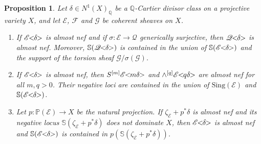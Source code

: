 \documentclass[english,reqno]{amsart}
\newcommand\bbQ{{\mathbb Q}}
\newcommand\bbS{{\mathbb S}}
\newcommand\sE{{\mathscr E}}
\newcommand\sF{{\mathscr F}}
\newcommand\sG{{\mathscr G}}
\newcommand\sQ{{\mathscr Q}}
\theoremstyle{plain}
\newtheorem{prop}[thm]{Proposition}
\theoremstyle{definition}
\numberwithin{equation}{section} %
\begin{document}
\begin{prop}\label{Almost-nef-properties}
    Let $\delta\in N^1(X)_{\bbQ}$ be a $\bbQ$-Cartier divisor class on a projective variety $X$, and let $\sE$, $\sF$ and $\sG$ be coherent sheaves on $X$.
    \begin{enumerate}
        \item If   $\sE\hspace{-0.8ex}<\hspace{-0.8ex}\delta\hspace{-0.8ex}>$ is almost nef and if $\sigma\colon \sE\rightarrow \sQ$ generically surjective, then $\sQ\hspace{-0.8ex}<\hspace{-0.8ex}\delta\hspace{-0.8ex}>$ is almost nef. Moreover, $\bbS(\sQ\hspace{-0.8ex}<\hspace{-0.8ex}\delta\hspace{-0.8ex}>)$ is contained in the union of $\bbS(\sE\hspace{-0.8ex}<\hspace{-0.8ex}\delta\hspace{-0.8ex}>)$ and the support of the torsion sheaf $\sG/\sigma(\sG)$.

        \item If $\sE\hspace{-0.8ex}<\hspace{-0.8ex}\delta\hspace{-0.8ex}>$ is almost nef, then $S^{[m]}\sE\hspace{-0.8ex}<\hspace{-0.8ex}m\delta\hspace{-0.8ex}>$ and $\wedge^{[q]}\sE\hspace{-0.8ex}<\hspace{-0.8ex}q\delta\hspace{-0.8ex}>$ are almost nef for all $m,q>0$.  Their negative loci are contained in the union of  $\mathrm{Sing}(\sE)$ and $\bbS(\sE\hspace{-0.8ex}<\hspace{-0.8ex}\delta\hspace{-0.8ex}>)$.

        \item  Let $p \colon \mathbb{P}(\sE) \to X$ be the natural projection. If $\zeta_{\sE}+p^*\delta$ is almost nef  and its negative locus $\bbS(\zeta_{\sE}+p^*\delta)$ does not dominate $X$, then  $\sE\hspace{-0.8ex}<\hspace{-0.8ex}\delta\hspace{-0.8ex}>$   is almost nef and $\bbS(\sE\hspace{-0.8ex}<\hspace{-0.8ex}\delta\hspace{-0.8ex}>)$ is contained in   $p(\bbS(\zeta_{\sE}+p^*\delta))$.


\end{enumerate}
\end{prop}
\end{document}

